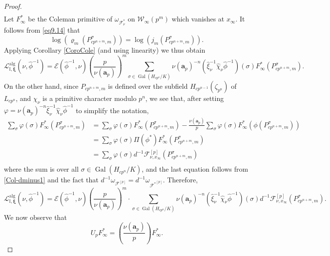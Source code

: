 \documentclass[a4paper,11pt]{amsart}
\numberwithin{equation}{section}
\theoremstyle{plain}
\theoremstyle{definition}
\theoremstyle{remark}
\newcommand{\I}{\mathbb{I}}
\DeclareMathOperator{\Gal}{Gal}
\begin{document}
\begin{proof}
{{\begin{equation}
\begin{split}
\end{split}\end{equation}}}
Let $F_\infty^*$ be the Coleman primitive of $\omega_{\mathcal{F}_\nu^*}$ on $\mathcal{W}_\infty(p^m)$ which vanishes at $x_\infty$. 
It follows from \eqref{eq9.14} that 
\[\log(\varrho_m( P_{cp^{n+m},m}^\sigma))=\log(j_m( P_{cp^{n+m},m}^\sigma)).\]
Applying Corollary \ref{CoroCole} (and using linearity) we thus obtain 
\[\mathscr{L}_{\I,\boldsymbol{\xi}}^{\mathrm{alg}}(\nu,\hat\phi^{-1})=\mathcal{E}(\hat\phi^{-1},\nu)\left(\frac{p}{\nu(\mathbf{a}_p)}\right)^m\sum_{\sigma\in\Gal(H_{cp^n}/K)}\nu(\mathbf{a}_p)^{-n}
(\hat\xi_\nu^{-1}\hat\chi_\nu\hat\phi^{-1})(\sigma)F_\infty^*({P}_{cp^{n+m},m}^\sigma).\]
On the other hand, since ${P}_{cp^{n+m},m}$ is defined over the subfield $H_{cp^{n-1}}(\zeta_{p^n})$ of $L_{cp^n}$, and $\chi_\nu$ is a primitive character modulo $p^n$,
we see that, after setting $\varphi=\nu(\mathbf{a}_p)^{-n}\hat\xi_\nu^{-1}\hat\chi_\nu\hat\phi^{-1}$ to simplify the notation,  
\begin{equation} \begin{split}
\sum_{\sigma}
\varphi(\sigma)F_\infty^*({P}_{cp^{n+m},m}^\sigma)&= 
\sum_{\sigma}
\varphi(\sigma)F_\infty^*({P}_{cp^{n+m},m}^\sigma)-\frac{\nu(\mathbf{a}_p)}{p}\sum_\sigma\varphi(\sigma)F^*_\infty(\phi({P}_{cp^{n+m},m}^\sigma))\\
&=\sum_{\sigma}
\varphi(\sigma)\Pi(\phi^*)F_\infty^*({P}_{cp^{n+m},m}^\sigma)\\
&=\sum_{\sigma}
\varphi (\sigma) d^{-1}{\mathcal{F}_{\nu , x_\infty}^{[p]}}({P}_{cp^{n+m},m}^\sigma)\\
\end{split}\end{equation}
where the sum is over all $\sigma\in\Gal(H_{cp^n}/K)$, and the last equation follows from \eqref{Col-dminus1} and the fact that $d^{-1}\omega_{\mathcal{F}^{[p]}}=d^{-1}\omega_{{\mathcal{F}^*}^{[p]}}$. Therefore, 
{\footnotesize{
\begin{equation}\label{13.5eq4}\mathscr{L}_{\I,\boldsymbol{\xi}}^{\mathrm{alg}}(\nu,\hat\phi^{-1})=\mathcal{E}(\hat\phi^{-1},\nu)\left(\frac{p}{\nu(\mathbf{a}_p)}\right)^m\cdot\sum_{\sigma\in\Gal(H_{cp^n}/K)}\nu(\mathbf{a}_p)^{-n}(\hat\xi_\nu^{-1}\hat\chi_\nu\hat\phi^{-1})(\sigma)d^{-1}{\mathcal{F}_{\nu, x_\infty}^{[p]}}({P}_{cp^{n+m},m}^\sigma).\end{equation} }}
We now observe that 
\begin{equation}\label{13.5eq3} U_pF_\infty^*=\left(\frac{\nu(\mathbf{a}_p)}{p}\right)F_\infty^*.\end{equation}

\end{proof}
\end{document}
